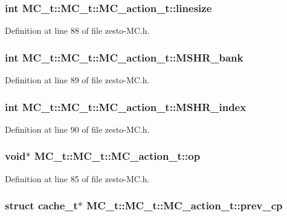 \subsubsection[{linesize}]{\setlength{\rightskip}{0pt plus 5cm}int MC\_\-t::MC\_\-t::MC\_\-action\_\-t::linesize}\label{structMC__t_1_1MC__action__t_d52d9da9b65c92ea0ebf09a57a496980}




Definition at line 88 of file zesto-MC.h.
\subsubsection[{MSHR\_\-bank}]{\setlength{\rightskip}{0pt plus 5cm}int MC\_\-t::MC\_\-t::MC\_\-action\_\-t::MSHR\_\-bank}\label{structMC__t_1_1MC__action__t_2f86dea7975997f3a054cd6ce9370e15}




Definition at line 89 of file zesto-MC.h.
\subsubsection[{MSHR\_\-index}]{\setlength{\rightskip}{0pt plus 5cm}int MC\_\-t::MC\_\-t::MC\_\-action\_\-t::MSHR\_\-index}\label{structMC__t_1_1MC__action__t_d09061a7c47cdc4d9612bd20d3378ac0}




Definition at line 90 of file zesto-MC.h.
\subsubsection[{op}]{\setlength{\rightskip}{0pt plus 5cm}void$\ast$ MC\_\-t::MC\_\-t::MC\_\-action\_\-t::op}\label{structMC__t_1_1MC__action__t_c90f69db72b3ed2bfba880d0aadc7c22}




Definition at line 85 of file zesto-MC.h.
\subsubsection[{prev\_\-cp}]{\setlength{\rightskip}{0pt plus 5cm}struct {\bf cache\_\-t}$\ast$ MC\_\-t::MC\_\-t::MC\_\-action\_\-t::prev\_\-cp\hspace{0.3cm}{\tt  [read]}}\label{structMC__t_1_1MC__action__t_58187cd08f8cbdc317d7f660270578b8}




